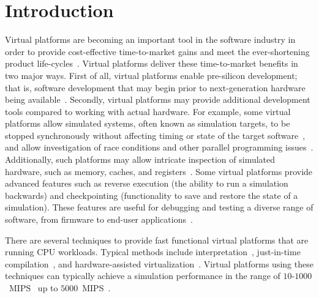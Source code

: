 
\section{Introduction}
\label{sec:introduction}
Virtual platforms are becoming an important tool in the software industry in order to provide cost-effective time-to-market gains and meet the ever-shortening product life-cycles~\cite{journals:magnusson:2002, journals:yi:2006}.
Virtual platforms deliver these time-to-market benefits in two major ways.
First of all, virtual platforms enable pre-silicon development; that is, software development that may begin prior to next-generation hardware being available~.
Secondly, virtual platforms may provide additional development tools compared to working with actual hardware.
For example, some virtual platforms allow simulated systems, often known as simulation targets, to be stopped synchronously without affecting timing or state of the target software~, and allow investigation of race conditions and other parallel programming issues~.
Additionally, such platforms may allow intricate inspection of simulated hardware, such as memory, caches, and registers~.
Some virtual platforms provide advanced features such as reverse execution (the ability to run a simulation backwards) and checkpointing (functionality to save and restore the state of a simulation).
These features are useful for debugging and testing a diverse range of software, from firmware to end-user applications~.

There are several techniques to provide fast functional virtual platforms that are running CPU workloads.
Typical methods include interpretation~, just-in-time compilation~, and hardware-assisted virtualization~.
Virtual platforms using these techniques can typically achieve a simulation performance in the range of $10$-$1000$~MIPS~ up to $5000$~MIPS~.

